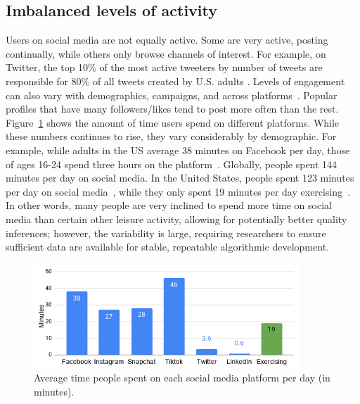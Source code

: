 \documentclass[11pt]{article} %
\begin{document}
\subsection{Imbalanced levels of activity}
Users on social media are not equally active. Some are very active, posting continually, while others only browse channels of interest. For example, on Twitter, the top 10\% of the most active tweeters by number of tweets are responsible for 80\% of all tweets created by U.S. adults \cite{pew_twitter}. Levels of engagement can also vary with demographics, campaigns, and across platforms~\cite{perrin2019}. Popular profiles that have many followers/likes tend to post more often than the rest. Figure~\ref{fig:mins_per_day} shows the amount of time users spend on different platforms. While these numbers continues to rise, they vary considerably by demographic. For example, while adults in the US average 38 minutes on Facebook per day, those of ages 16-24 spend three hours on the platform~\cite{whatagraph2020}. Globally, people spent 144 minutes per day on social media. In the United States, people spent 123 minutes per day on social media~\cite{sm_usage}, while they only spent 19 minutes per day exercising~\cite{american_time_spent2020}. In other words, many people are very inclined to spend more time on social media than certain other leisure activity, allowing for potentially better quality inferences; however, the variability is large, requiring researchers to ensure sufficient data are available for stable, repeatable algorithmic development. 
\begin{figure}
    \centering
        \includegraphics[width=10cm]{figs/time_spentExercise.png} %
    \caption{Average time people spent on each social media platform per day (in minutes).} 
    \label{fig:mins_per_day}
\end{figure}
\end{document}
